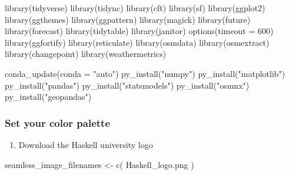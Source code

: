 \documentclass[
  paper=a4,
  ,captions=tableheading
]{scrartcl}
\newenvironment{Shaded}{\begin{snugshade}}{\end{snugshade}}
\newcommand{\AttributeTok}[1]{\textcolor[rgb]{0.77,0.63,0.00}{#1}}
\newcommand{\DecValTok}[1]{\textcolor[rgb]{0.00,0.00,0.81}{#1}}
\newcommand{\FunctionTok}[1]{\textcolor[rgb]{0.00,0.00,0.00}{#1}}
\newcommand{\NormalTok}[1]{#1}
\newcommand{\OtherTok}[1]{\textcolor[rgb]{0.56,0.35,0.01}{#1}}
\newcommand{\StringTok}[1]{\textcolor[rgb]{0.31,0.60,0.02}{#1}}
\providecommand{\tightlist}{%
  \setlength{\itemsep}{0pt}\setlength{\parskip}{0pt}}
\begin{document}
\begin{Shaded}
\begin{Highlighting}[]
\FunctionTok{library}\NormalTok{(tidyverse)}
\FunctionTok{library}\NormalTok{(tidync)}
\FunctionTok{library}\NormalTok{(cft)}
\FunctionTok{library}\NormalTok{(sf)}
\FunctionTok{library}\NormalTok{(ggplot2)}
\FunctionTok{library}\NormalTok{(ggthemes)}
\FunctionTok{library}\NormalTok{(ggpattern)}
\FunctionTok{library}\NormalTok{(magick)}
\FunctionTok{library}\NormalTok{(future)}
\FunctionTok{library}\NormalTok{(forecast)}
\FunctionTok{library}\NormalTok{(tidytable)}
\FunctionTok{library}\NormalTok{(janitor)}
\FunctionTok{options}\NormalTok{(}\AttributeTok{timeout =} \DecValTok{600}\NormalTok{)}
\FunctionTok{library}\NormalTok{(ggfortify)}
\FunctionTok{library}\NormalTok{(reticulate)}
\FunctionTok{library}\NormalTok{(osmdata)}
\FunctionTok{library}\NormalTok{(osmextract)}
\FunctionTok{library}\NormalTok{(changepoint)}
\FunctionTok{library}\NormalTok{(weathermetrics)}
\end{Highlighting}
\end{Shaded}

\begin{Shaded}
\begin{Highlighting}[]
\FunctionTok{conda\_update}\NormalTok{(}\AttributeTok{conda =} \StringTok{"auto"}\NormalTok{)}
\FunctionTok{py\_install}\NormalTok{(}\StringTok{"numpy"}\NormalTok{)}
\FunctionTok{py\_install}\NormalTok{(}\StringTok{"matplotlib"}\NormalTok{)}
\FunctionTok{py\_install}\NormalTok{(}\StringTok{"pandas"}\NormalTok{)}
\FunctionTok{py\_install}\NormalTok{(}\StringTok{"statsmodels"}\NormalTok{)}
\FunctionTok{py\_install}\NormalTok{(}\StringTok{"osmnx"}\NormalTok{)}
\FunctionTok{py\_install}\NormalTok{(}\StringTok{"geopandas"}\NormalTok{)}
\end{Highlighting}
\end{Shaded}

\hypertarget{set-your-color-palette}{%
\subsubsection{Set your color palette}\label{set-your-color-palette}}

\begin{enumerate}
\def\labelenumi{\arabic{enumi}.}
\tightlist
\item
  Download the Haskell university logo
\end{enumerate}

\begin{Shaded}
\begin{Highlighting}[]
\NormalTok{seamless\_image\_filenames }\OtherTok{\textless{}{-}} \FunctionTok{c}\NormalTok{(}
  \StringTok{\textquotesingle{}Haskell\_logo.png\textquotesingle{}}
\NormalTok{)}
\end{Highlighting}
\end{Shaded}
\end{document}
